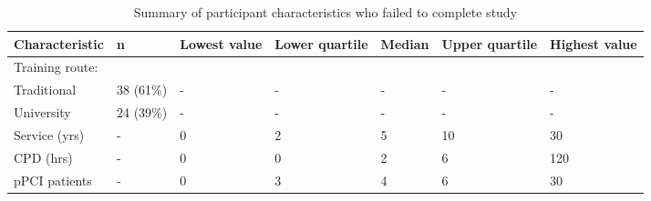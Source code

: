 \begin{table}[htbp]
\centering
\caption{Summary of participant characteristics who failed to complete study} 
\label{partcharnofinish}
\begin{tabular}{BKNNNNN}
  \hline
Characteristic & n & Lowest value & Lower quartile & Median & Upper quartile & Highest value \\ 
  \hline
Training route: &   &   &   &   &   &   \\ 
  Traditional & 38 (61\%) & - & - & - & - & - \\ 
  University & 24 (39\%) & - & - & - & - & - \\ 
  Service (yrs) & - & 0 & 2 & 5 & 10 & 30 \\ 
  CPD (hrs) & - & 0 & 0 & 2 & 6 & 120 \\ 
  pPCI patients & - & 0 & 3 & 4 & 6 & 30 \\ 
   \hline
\end{tabular}
\end{table}
